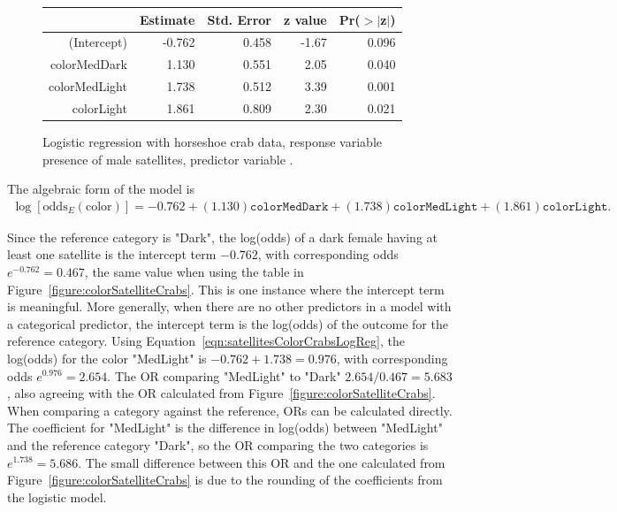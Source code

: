 \begin{figure}[ht]
\centering
\begin{tabular}{rrrrr}
  \hline
 & Estimate & Std. Error & z value & Pr($>$$|$z$|$) \\
  \hline
(Intercept) & -0.762 & 0.458 & -1.67 & 0.096 \\
  colorMedDark & 1.130 & 0.551 & 2.05 & 0.040 \\
  colorMedLight & 1.738 & 0.512 & 3.39 & 0.001 \\
  colorLight & 1.861 & 0.809 & 2.30 & 0.021 \\
   \hline
\end{tabular}
\caption{Logistic regression with horseshoe crab data, response variable
       presence of male satellites, predictor variable .}
\label{figure:satellitesColorCrabsLogReg}
\end{figure}

The algebraic form of the model is
\begin{align}
\log\left[\text{odds}_{E}(\text{color})\right] = -0.762 + (1.130)\texttt{colorMedDark}
 + (1.738)\texttt{colorMedLight} + (1.861)\texttt{colorLight}.
 \label{eqn:satellitesColorCrabsLogReg}
\end{align}

Since the reference category is "Dark", the log(odds) of a dark female having at least one satellite is the intercept term $-0.762$, with corresponding odds $e^{-0.762} = 0.467$, the same value when using the table in Figure~\ref{figure:colorSatelliteCrabs}. This is one instance where the intercept term is meaningful. More generally, when there are no other predictors in a model with a categorical predictor, the intercept term is the log(odds) of the outcome for the reference category. Using Equation~\ref{eqn:satellitesColorCrabsLogReg}, the log(odds) for the color "MedLight" is $-0.762 + 1.738 = 0.976$, with corresponding odds $e^{0.976} = 2.654$. The OR comparing "MedLight" to "Dark" $2.654/0.467 = 5.683$, also agreeing with the OR calculated from Figure~\ref{figure:colorSatelliteCrabs}.  When comparing a category against the reference, ORs can be calculated directly.  The coefficient for "MedLight" is the difference in log(odds) between "MedLight" and the reference category "Dark", so the OR comparing the two categories is $e^{1.738} = 5.686$.  The small difference between this OR and the one calculated from Figure~\ref{figure:colorSatelliteCrabs} is due to the rounding of the coefficients from the logistic model.

